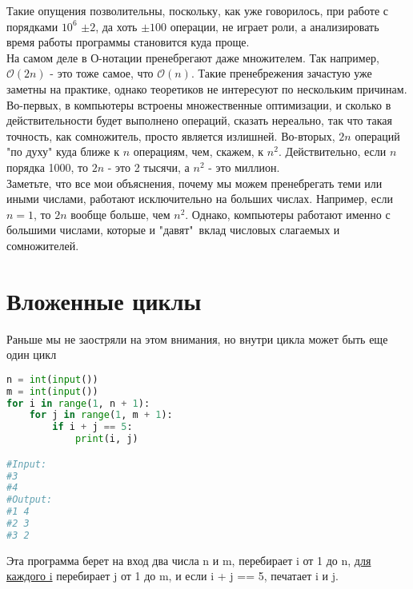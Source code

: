 \documentclass[12pt]{article} %
\def\O{\mathcal{O}}
\begin{document}
Такие опущения позволительны, поскольку, как уже говорилось, при работе с порядками $10^6$ $\pm2$, да хоть $\pm100$ операции, не играет роли, а анализировать время работы программы становится куда проще.\\

На самом деле в О-нотации пренебрегают даже множителем. Так например, $\O(2n)$ - это тоже самое, что  $\O(n)$. Такие пренебрежения зачастую уже заметны на практике, однако теоретиков не интересуют по нескольким причинам. Во-первых, в компьютеры встроены множественные оптимизации, и сколько в действительности будет выполнено операций, сказать нереально, так что такая точность, как сомножитель, просто является излишней. Во-вторых, $2n$ операций "по духу" куда ближе к $n$ операциям, чем, скажем, к $n^2$. Действительно, если $n$ порядка 1000, то $2n$ - это 2 тысячи, а $n^2$ - это миллион.\\

Заметьте, что все мои объяснения, почему мы можем пренебрегать теми или иными числами, работают исключительно на больших числах. Например, если $n = 1$, то $2n$ вообще больше, чем $n^2$. Однако, компьютеры работают именно с большими числами, которые и "давят"\ вклад числовых слагаемых и сомножителей.

\section{Вложенные циклы}
Раньше мы не заостряли на этом внимания, но внутри цикла может быть еще один цикл
\begin{lstlisting}[language=Python]
n = int(input())
m = int(input())
for i in range(1, n + 1):
	for j in range(1, m + 1):
		if i + j == 5:
			print(i, j)

#Input:
#3
#4
#Output:
#1 4
#2 3
#3 2
\end{lstlisting}

Эта программа берет на вход два числа n и m, перебирает i от 1 до n, \underline{для каждого i} перебирает j от 1 до m, и если i + j == 5, печатает i и j.
\end{document}

